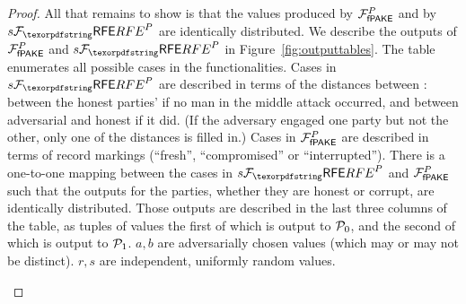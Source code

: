 \begin{proof}
All that remains to show is that the values produced by $\mathcal{F}_\textsf{fPAKE}^{P}$ and by $\Fsrfe^{P}$ are identically distributed.
We describe the outputs of $\mathcal{F}_\textsf{fPAKE}^{P}$ and $\Fsrfe^{P}$ in Figure~\ref{fig:outputtables}.
The table enumerates all possible cases in the functionalities. 
Cases in $\Fsrfe^{P}$ are described in terms of the distances between \passwords: between the honest parties' \passwords if no man in the middle attack occurred, and between adversarial and honest \passwords if it did.
(If the adversary engaged one party but not the other, only one of the distances is filled in.)
Cases in $\mathcal{F}_\textsf{fPAKE}^{P}$ are described in terms of record markings (``fresh'', ``compromised'' or ``interrupted'').
There is a one-to-one mapping between the cases in $\Fsrfe^{P}$ and $\mathcal{F}_\textsf{fPAKE}^{P}$ such that the outputs for the parties, whether they are honest or corrupt, are identically distributed.
Those outputs are described in the last three columns of the table, as tuples of values the first of which is output to $\mathcal{P}_{0}$, and the second of which is output to $\mathcal{P}_{1}$.
$a, b$ are adversarially chosen values (which may or may not be distinct).
$r, s$ are independent, uniformly random values.


\begin{figure}
\centering


\end{figure}
\end{proof}
